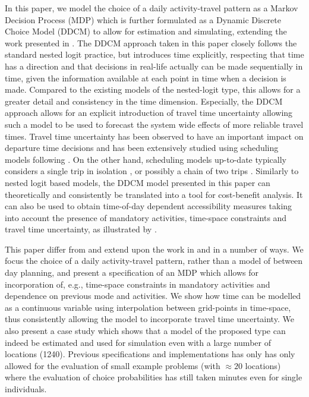 In this paper, we model the choice of a daily activity-travel pattern as a Markov Decision Process (MDP) which is further formulated as a Dynamic Discrete Choice Model (DDCM) to allow for estimation and simulating, extending the work presented in \citet{karlstrom04}. The DDCM approach taken in this paper closely follows the standard nested logit practice, but introduces time explicitly, respecting that time has a direction and that decisions in real-life actually can be made sequentially in time, given the information available at each point in time when a decision is made. Compared to the existing models of the nested-logit type, this allows for a greater detail and consistency in the time dimension. Especially, the DDCM approach allows for an explicit introduction of travel time uncertainty allowing such a model to be used to forecast the system wide effects of more reliable travel times. Travel time uncertainty has been observed to have an important impact on departure time decisions and has been extensively studied using scheduling models following \citet{small82scheduling}. On the other hand, scheduling models up-to-date typically considers a single trip in isolation \citep[as in, e.g.,][]{fosgerau10reliability}, or possibly a chain of two trips \citep{jenelius11tripchain}.
Similarly to nested logit based models, the DDCM model presented in this paper can theoretically and consistently
be translated into a tool for cost-benefit analysis. It can also be used to obtain time-of-day dependent accessibility measures taking into account the presence of mandatory activities, time-space constraints and travel time uncertainty, as illustrated by \citet{jonsson2014reconciling}.

This paper differ from and extend upon the work in \citet{karlstrom04} and \citet{jonsson2014reconciling} in a number of ways. We focus the choice of a daily activity-travel pattern, rather than a model of between day planning, and present a specification of an MDP which allows for incorporation of, e.g., time-space constraints in mandatory activities and dependence on previous mode and activities. We show how time can be modelled as a continuous variable using interpolation between grid-points in time-space, thus consistently allowing the model to incorporate travel time uncertainty. We also present a case study which shows that a model of the proposed type can indeed be estimated and used for simulation even with a large number of locations (1240). Previous specifications and implementations has only has only allowed for the evaluation of small example problems (with $\approx 20$ locations) where the evaluation of choice probabilities has still taken minutes even for single individuals.
 
